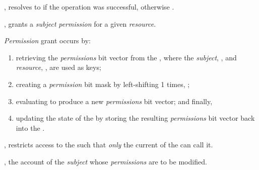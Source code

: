\begin{code}
\begin{functions}
      \begin{returns}
        \item {}, resolves to  if the operation was
          successful, otherwise .
      \end{returns}

    \item {},
      grants a \emph{subject} \emph{permission} for a given \emph{resource}.

      \begin{displayquote}
        \emph{Permission} grant occurs by:
        \begin{enumerate}
          \item retrieving the \emph{permissions} bit vector from the
             , where the
            \emph{subject}, , and \emph{resource},
            , are used as keys;

          \item creating a \emph{permission} bit mask by left-shifting 1
             times, ;

          \item evaluating  to produce a new
            \emph{permissions} bit vector; and finally,

          \item updating the state of the  by storing the
            resulting \emph{permissions} bit vector back into the
             .
        \end{enumerate}
      \end{displayquote}

      \begin{modifiers}
        \item {}, restricts access to the
           such that \emph{only} the current  of the
           can call it.
      \end{modifiers}

      \begin{parameters}
        \item {}, the account  of the
          \emph{subject} whose \emph{permissions} are to be modified.


\end{parameters}
\end{functions}
\end{code}
